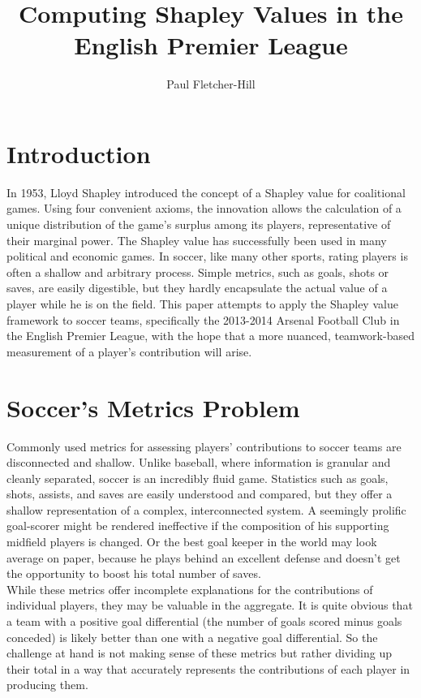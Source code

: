\documentclass[a4paper,10pt]{article}
\newcommand{\br}{\\[10pt]}
\begin{document}
  \title{Computing Shapley Values in the English Premier League}
  \author{Paul Fletcher-Hill}
  \maketitle
  \section*{Introduction}
  In 1953, Lloyd Shapley introduced the concept of a Shapley value for coalitional games. Using four convenient axioms, the innovation allows the calculation of a unique distribution of the game’s surplus among its players, representative of their marginal power. The Shapley value has successfully been used in many political and economic games. In soccer, like many other sports, rating players is often a shallow and arbitrary process. Simple metrics, such as goals, shots or saves, are easily digestible, but they hardly encapsulate the actual value of a player while he is on the field. This paper attempts to apply the Shapley value framework to soccer teams, specifically the 2013-2014 Arsenal Football Club in the English Premier League, with the hope that a more nuanced, teamwork-based measurement of a player’s contribution will arise.
  
  \section*{Soccer's Metrics Problem}
  Commonly used metrics for assessing players' contributions to soccer teams are disconnected and shallow. Unlike baseball, where information is granular and cleanly separated, soccer is an incredibly fluid game. Statistics such as goals, shots, assists, and saves are easily understood and compared, but they offer a shallow representation of a complex, interconnected system. A seemingly prolific goal-scorer might be rendered ineffective if the composition of his supporting midfield players is changed. Or the best goal keeper in the world may look average on paper, because he plays behind an excellent defense and doesn't get the opportunity to boost his total number of saves.
  \br
  While these metrics offer incomplete explanations for the contributions of individual players, they may be valuable in the aggregate. It is quite obvious that a team with a positive goal differential (the number of goals scored minus goals conceded) is likely better than one with a negative goal differential. So the challenge at hand is not making sense of these metrics but rather dividing up their total in a way that accurately represents the contributions of each player in producing them. 
  
\end{document}

